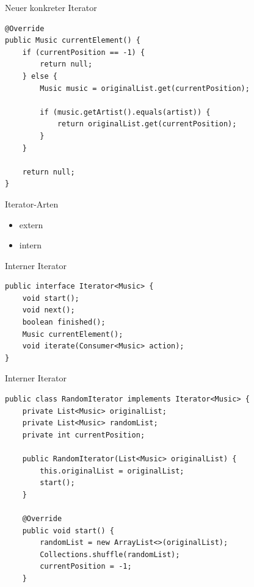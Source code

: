 \begin{frame}[fragile]{Neuer konkreter Iterator}
	\begin{exampleblock}{}
 		\begin{lstlisting}
@Override
public Music currentElement() {
    if (currentPosition == -1) {
        return null;
    } else {
        Music music = originalList.get(currentPosition);
        
        if (music.getArtist().equals(artist)) {
            return originalList.get(currentPosition);
        }
    }
    
    return null;
}
 		\end{lstlisting}
 	\end{exampleblock}
\end{frame}


\begin{frame}{Iterator-Arten}
	\begin{itemize}
 		\item extern
 		\item intern
 	\end{itemize}
\end{frame}


\begin{frame}[fragile]{Interner Iterator}
	\begin{exampleblock}{}
 		\begin{lstlisting}
public interface Iterator<Music> {
	void start();
	void next();
	boolean finished();
	Music currentElement();
	void iterate(Consumer<Music> action);
} 		    
 		\end{lstlisting}
 	\end{exampleblock}
\end{frame}


\begin{frame}[fragile]{Interner Iterator}
	\begin{exampleblock}{}
 		\begin{lstlisting}
public class RandomIterator implements Iterator<Music> {
	private List<Music> originalList;
	private List<Music> randomList;
	private int currentPosition;
	
	public RandomIterator(List<Music> originalList) {
		this.originalList = originalList;
		start();
	}

	@Override
	public void start() {
		randomList = new ArrayList<>(originalList);
		Collections.shuffle(randomList);
		currentPosition = -1;
	}
 		\end{lstlisting}
 	\end{exampleblock}
\end{frame}


